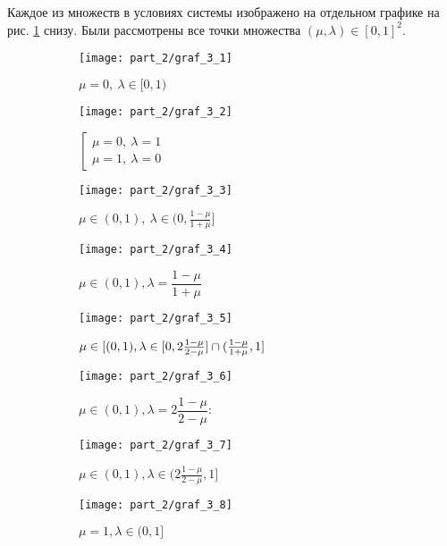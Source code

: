 Каждое из множеств в условиях системы изображено на отдельном графике
на рис. \ref{fig:lambda_mu_set} снизу. Были рассмотрены все точки
множества $(\mu, \lambda) \in [0,1]^2$.

\begin{figure}[H]
	\centering
	\begin{subfigure}[b]{0.3 \textwidth}
		\texttt{[image: part\_2/graf\_3\_1]}
		\caption{$\mu = 0, \: \lambda \in [0, 1)$}
	\end{subfigure}
	\begin{subfigure}[b]{0.3 \textwidth}
		\texttt{[image: part\_2/graf\_3\_2]}
		\caption{
			$
			\left[
			\begin{array}{c}
     			\mu=0, \: \lambda = 1 \\
     			\mu=1, \: \lambda = 0
  			\end{array}
			\right.
			$
		}
	\end{subfigure}
	\begin{subfigure}[b]{0.3 \textwidth}	
		\texttt{[image: part\_2/graf\_3\_3]}
		\caption{
			$
				\mu \in (0,1), \:
				\lambda \in (0, \frac{1 - \mu}{1 + \mu}]
			$		
		}
	\end{subfigure}
	\newline	
	\centering
	\begin{subfigure}[b]{0.3 \textwidth}
		\texttt{[image: part\_2/graf\_3\_4]}
		\caption{
			$\mu \in (0,1), \lambda = \dfrac{1-\mu}{1+\mu}$		
		}
	\end{subfigure}
	\begin{subfigure}[b]{0.3 \textwidth}
		\texttt{[image: part\_2/graf\_3\_5]}
		\caption{
			$\mu \in [(0, 1), \newline 
			\lambda \in 
			[0, 2\frac{1 - \mu}{2 - \mu}] \cap 
			(\frac{1 - \mu}{1 + \mu}, 1]$
		}
	\end{subfigure}
	\begin{subfigure}[b]{0.3 \textwidth}	
		\texttt{[image: part\_2/graf\_3\_6]}
		\caption{
			$\mu \in (0, 1), \lambda = 2\dfrac{1 - \mu}{2 - \mu}$: 
		}
	\end{subfigure}
	\newline
	\begin{subfigure}[b]{0.3 \textwidth}
		\texttt{[image: part\_2/graf\_3\_7]}
		\caption{
			$\mu \in (0, 1), 
			\lambda \in (2\frac{1 - \mu}{2 - \mu}, 1]$		
		}
	\end{subfigure}
	\begin{subfigure}[b]{0.3 \textwidth}
		\texttt{[image: part\_2/graf\_3\_8]}
		\caption{
			$\mu = 1, \lambda \in (0, 1] $		
		}
	\end{subfigure}
	\caption{}
	\label{fig:lambda_mu_set}
\end{figure}